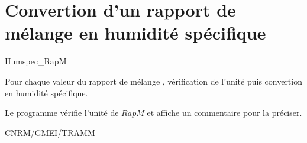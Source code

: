 %
\section{Convertion d'un rapport de m\'elange en humidit\'e sp\'ecifique}

 {\sf Humspec\_RapM}

Pour chaque valeur du rapport de m\'elange , v\'erification de l'unit\'e puis convertion en humidit\'e sp\'ecifique.

\bigskip





        Le programme v\'erifie l'unit\'e de $RapM$ et affiche un commentaire pour la pr\'eciser.


CNRM/GMEI/TRAMM


